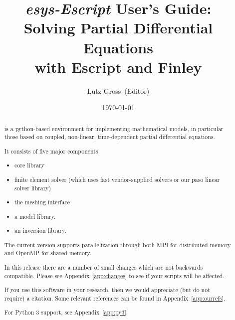 \documentclass{esysdoc}
\title{\emph{esys-Escript} User's Guide:\\ Solving Partial Differential Equations\\ with Escript and Finley}
\author{Lutz Gross\etal~(Editor)}
\date{\today}
\begin{document}
\maketitle

\ifpdf
{}
\fi





\begin{abstract}%
\escript is a python-based environment for implementing mathematical models, in particular those based on coupled, non-linear, time-dependent partial differential equations.



It consists of five major components
\begin{itemize}
\item \escript core library
\item finite element solver \finley (which uses fast vendor-supplied solvers or our paso linear solver library)
\item the meshing interface \pycad
\item a model library.
\item an inversion library.
\end{itemize}
The current version supports parallelization through both MPI for distributed
memory and OpenMP for shared memory.

In this release there are a number of small changes which are not backwards compatible.
Please see Appendix~\ref{app:changes} to see if your scripts will be affected.

If you use this software in your research, then we would appreciate (but do not require) a citation.
Some relevant references can be found in Appendix~\ref{app:ourrefs}.

For Python 3 support, see Appendix~\ref{app:py3}.
\end{abstract}

\cleardoublepage{}%
\tableofcontents













\esysappendix %

%


\cleardoublepage
{}
{}
\printindex

\cleardoublepage
{}
{}


\end{document}
